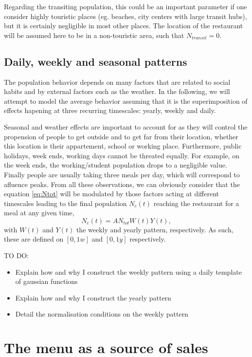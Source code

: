 \documentclass{article}
\begin{document}
Regarding the transiting population, this could be an important parameter if one consider highly touristic places (eg. beaches, city centers with large transit hubs), but it is certainly negligible in most other places. The location of the restaurant will be assumed here to be in a non-touristic area, such that $N_{transit} = 0$.


    \subsection{Daily, weekly and seasonal patterns} \label{sec:2:3}
The population behavior depends on many factors that are related to social habits and by external factors such as the weather. 
In the following, we will attempt to model the average behavior assuming that it is the superimposition of effects hapening at three recurring timescales: yearly, weekly and daily.

Seasonal and weather effects are important to account for as they will control the propension of people to get outside and to get far from their location, whether this location is their appartement, school or working place. Furthermore, public holidays, week ends, working days cannot be threated equally. For example, on the week ends, the working/student population drops to a negligible value. Finally people are usually taking three meals per day, which will correspond to afluence peaks. From all these observations, we can obviously consider that the equation \ref{eq:Ntot} will be modulated by those factors acting at different timescales leading to the final population $N_c(t)$ reaching the restaurant for a meal at any given time,
\begin{equation} \label{eq:Nc}
    N_c(t) = A N_{tot} W(t) Y(t),
\end{equation}
with $W(t)$ and $Y(t)$ the weekly and yearly pattern, respectively. As such, these are defined on $[0, 1w]$ and $[0,1y]$ respectively. 

TO DO:
\begin{itemize}
    \item Explain how and why I construct the weekly pattern using a daily template of gaussian functions
    \item Explain how and why I construct the yearly pattern
    \item Detail the normalisation conditions on the weekly pattern
\end{itemize}

\section{The menu as a source of sales}
\end{document}
